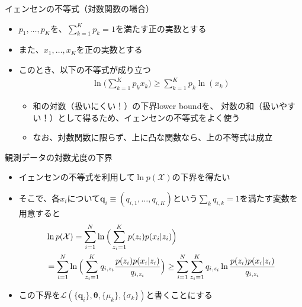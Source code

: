\documentclass[aspectratio=169,unicode,dvipdfmx,14pt]{beamer}
\begin{document}
\begin{frame}{イェンセンの不等式（対数関数の場合）}
\begin{itemize}
\item $p_1,\ldots,p_K$を、$\sum_{k=1}^K p_k=1$を満たす正の実数とする
\item また、$x_1,\ldots, x_K$を正の実数とする
\item このとき、以下の不等式が成り立つ
\begin{align}
\ln \bigg( \sum_{k=1}^K p_k x_k \bigg) \geq \sum_{k=1}^K p_k \ln(x_k)
\end{align}
\begin{itemize}
\item 和の対数（扱いにくい！）の下界lower boundを、
対数の和（扱いやすい！）として得るため、イェンセンの不等式をよく使う
\item なお、対数関数に限らず、上に凸な関数なら、上の不等式は成立
\end{itemize}
\end{itemize}
\end{frame}

\begin{frame}{観測データの対数尤度の下界}
\begin{itemize}
\item イェンセンの不等式を利用して$\ln p(\mathcal{X})$の下界を得たい
\item そこで、各$x_i$について$\bm{q}_i \equiv (q_{i,1}, \ldots, q_{i,K})$という$\sum_k q_{i,k}=1$を満たす変数を用意すると
\begin{align}
& \ln p(\mathcal{X}) = \sum_{i=1}^N \ln \Big( \sum_{z_i=1}^K p(z_i) p(x_i | z_i) \Big)
\notag \\ & = \sum_{i=1}^N \ln \Big( \sum_{z_i=1}^K q_{i,z_i} \frac{p(z_i) p(x_i | z_i)}{q_{i,z_i}} \Big)
\geq 
\sum_{i=1}^N \sum_{z_i=1}^K q_{i,z_i} \ln\frac{p(z_i) p(x_i | z_i)}{q_{i,z_i}}
\label{eq:LB}
\end{align}
\vspace{-.2in}
\item この下界を$\mathcal{L}(\{ \bm{q}_i \},\bm{\theta},\{\mu_k\},\{\sigma_k\})$と書くことにする
\end{itemize}
\end{frame}
\end{document}
